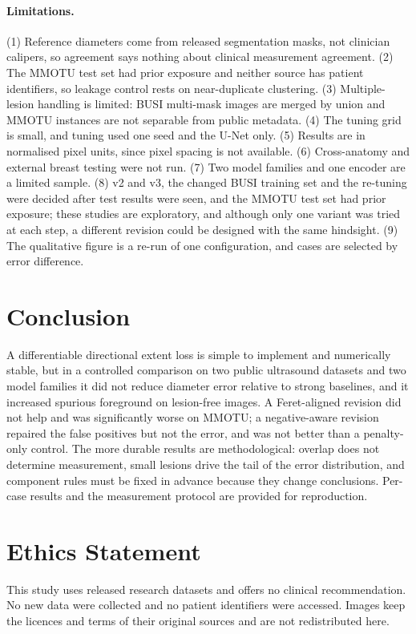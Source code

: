 \documentclass{midl}
\begin{document}
\paragraph{Limitations.} (1) Reference diameters come from released segmentation masks, not clinician calipers, so agreement says nothing about clinical measurement agreement. (2) The MMOTU test set had prior exposure and neither source has patient identifiers, so leakage control rests on near-duplicate clustering. (3) Multiple-lesion handling is limited: BUSI multi-mask images are merged by union and MMOTU instances are not separable from public metadata. (4) The tuning grid is small, and tuning used one seed and the U-Net only. (5) Results are in normalised pixel units, since pixel spacing is not available. (6) Cross-anatomy and external breast testing were not run. (7) Two model families and one encoder are a limited sample. (8) v2 and v3, the changed BUSI training set and the re-tuning were decided after test results were seen, and the MMOTU test set had prior exposure; these studies are exploratory, and although only one variant was tried at each step, a different revision could be designed with the same hindsight. (9) The qualitative figure is a re-run of one configuration, and cases are selected by error difference.

\section{Conclusion}
A differentiable directional extent loss is simple to implement and numerically stable, but in a controlled comparison on two public ultrasound datasets and two model families it did not reduce diameter error relative to strong baselines, and it increased spurious foreground on lesion-free images. A Feret-aligned revision did not help and was significantly worse on MMOTU; a negative-aware revision repaired the false positives but not the error, and was not better than a penalty-only control. The more durable results are methodological: overlap does not determine measurement, small lesions drive the tail of the error distribution, and component rules must be fixed in advance because they change conclusions. Per-case results and the measurement protocol are provided for reproduction.

\clearpage
\section*{Ethics Statement}
This study uses released research datasets and offers no clinical recommendation. No new data were collected and no patient identifiers were accessed. Images keep the licences and terms of their original sources and are not redistributed here.
\end{document}
